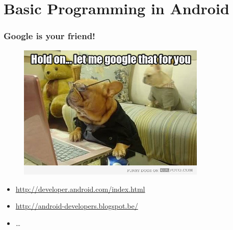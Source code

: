 \documentclass{beamer}
\begin{document}
{
	\begin{frame}[plain]
	\end{frame}
}




\section{Basic Programming in Android}
\sectionframe

\begin{frame}
\frametitle{Google is your friend!}
\begin{figure}
	\centering
		\includegraphics[width=0.8\textwidth]{img/google.jpg}
	\label{fig:google}
\end{figure}
\begin{itemize}
	\item \url{http://developer.android.com/index.html}
	\item \url{http://android-developers.blogspot.be/}
	\item \dots
\end{itemize}
\end{frame}
\end{document}
